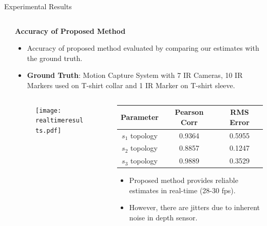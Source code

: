 \documentclass[final,hyperref={pdfpagelabels=false}]{beamer}
\begin{document}
\begin{frame}[t]
\begin{columns}[t]
\begin{column}{0.96\linewidth}
\begin{alertblock}{Experimental Results}
\begin{columns}[t]
\begin{column}{0.49\linewidth}
\begin{columns}[t]
\begin{column}{0.49\linewidth}
\end{column}

\end{columns}

\end{column}

\begin{column}{0.49\linewidth}

\centering \textbf{Accuracy of Proposed Method}

\begin{itemize}
\item Accuracy of proposed method evaluated by comparing our estimates with the ground truth.
\vspace{3mm}
\item \textbf{Ground Truth}: Motion Capture System with 7 IR Cameras, 10 IR Markers used on T-shirt collar and 1 IR Marker on T-shirt sleeve.
\end{itemize}

\begin{columns}[t]

\begin{column}{0.59\linewidth}

\begin{figure}
\centering
\texttt{[image: realtimeresults.pdf]}
\end{figure}

\end{column}

\begin{column}{0.39\linewidth}

\begin{table}
\centering
\begin{center}
\small
\begin{tabular}{ccc}
\toprule
Parameter & Pearson Corr & RMS Error\\[0.2cm]
\midrule
$s_1$ topology & 0.9364 & 0.5955\\
$s_2$ topology & 0.8857 & 0.1247\\
$s_3$ topology & 0.9889 & 0.3529\\
\bottomrule
\end{tabular}
\end{center}
\end{table}

\vspace{4mm}

\begin{itemize}
\item Proposed method provides reliable estimates in real-time (28-30 fps).
\vspace{3mm}
\item However, there are jitters due to inherent noise in depth sensor.
\end{itemize}


\end{column}
\end{columns}
\end{column}
\end{columns}
\end{alertblock}
\end{column}
\end{columns}
\end{frame}
\end{document}
